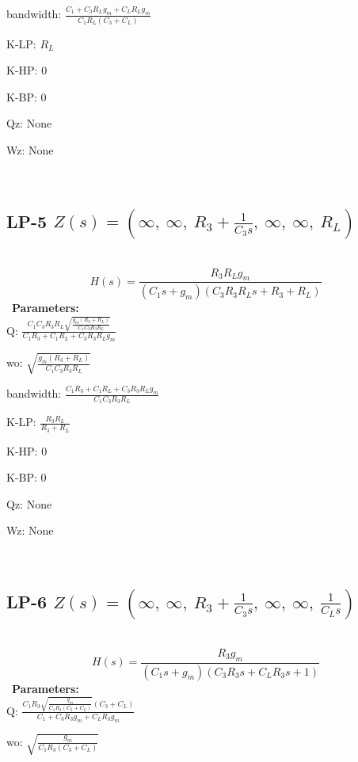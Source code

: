 \documentclass{article}
\begin{document}
bandwidth: $\frac{C_{1} + C_{3} R_{L} g_{m} + C_{L} R_{L} g_{m}}{C_{1} R_{L} \left(C_{3} + C_{L}\right)}$\ 

K-LP: $R_{L}$\ 

K-HP: $0$\ 

K-BP: $0$\ 

Qz: $\text{None}$\ 

Wz: $\text{None}$\ 

\ 

\subsection{LP-5 $Z(s) = \left( \infty, \  \infty, \  R_{3} + \frac{1}{C_{3} s}, \  \infty, \  \infty, \  R_{L}\right)$ } \ 
\textbf{\[H(s) = \frac{R_{3} R_{L} g_{m}}{\left(C_{1} s + g_{m}\right) \left(C_{3} R_{3} R_{L} s + R_{3} + R_{L}\right)}\] } \ 
\textbf{Parameters:}\\ 

Q: $\frac{C_{1} C_{3} R_{3} R_{L} \sqrt{\frac{g_{m} \left(R_{3} + R_{L}\right)}{C_{1} C_{3} R_{3} R_{L}}}}{C_{1} R_{3} + C_{1} R_{L} + C_{3} R_{3} R_{L} g_{m}}$\ 

wo: $\sqrt{\frac{g_{m} \left(R_{3} + R_{L}\right)}{C_{1} C_{3} R_{3} R_{L}}}$\ 

bandwidth: $\frac{C_{1} R_{3} + C_{1} R_{L} + C_{3} R_{3} R_{L} g_{m}}{C_{1} C_{3} R_{3} R_{L}}$\ 

K-LP: $\frac{R_{3} R_{L}}{R_{3} + R_{L}}$\ 

K-HP: $0$\ 

K-BP: $0$\ 

Qz: $\text{None}$\ 

Wz: $\text{None}$\ 

\ 

\subsection{LP-6 $Z(s) = \left( \infty, \  \infty, \  R_{3} + \frac{1}{C_{3} s}, \  \infty, \  \infty, \  \frac{1}{C_{L} s}\right)$ } \ 
\textbf{\[H(s) = \frac{R_{3} g_{m}}{\left(C_{1} s + g_{m}\right) \left(C_{3} R_{3} s + C_{L} R_{3} s + 1\right)}\] } \ 
\textbf{Parameters:}\\ 

Q: $\frac{C_{1} R_{3} \sqrt{\frac{g_{m}}{C_{1} R_{3} \left(C_{3} + C_{L}\right)}} \left(C_{3} + C_{L}\right)}{C_{1} + C_{3} R_{3} g_{m} + C_{L} R_{3} g_{m}}$\ 

wo: $\sqrt{\frac{g_{m}}{C_{1} R_{3} \left(C_{3} + C_{L}\right)}}$\ 
\end{document}
